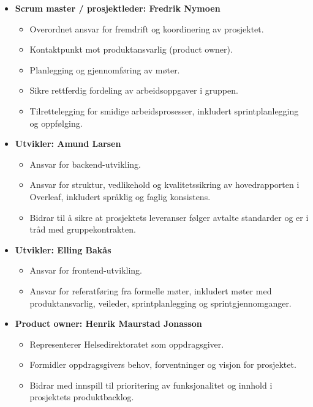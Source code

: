 \begin{itemize}
    \item \textbf{Scrum master / prosjektleder: Fredrik Nymoen}
        \begin{itemize}
            \item Overordnet ansvar for fremdrift og koordinering av prosjektet.
            \item Kontaktpunkt mot produktansvarlig (product owner).
            \item Planlegging og gjennomføring av møter.
            \item Sikre rettferdig fordeling av arbeidsoppgaver i gruppen.
            \item Tilrettelegging for smidige arbeidsprosesser, inkludert sprintplanlegging og oppfølging.
        \end{itemize}
        
    \item \textbf{Utvikler: Amund Larsen}
        \begin{itemize}
            \item Ansvar for backend-utvikling.
            \item Ansvar for struktur, vedlikehold og kvalitetssikring av hovedrapporten i Overleaf, inkludert språklig og faglig konsistens.
            \item Bidrar til å sikre at prosjektets leveranser følger avtalte standarder og er i tråd med gruppekontrakten.
        \end{itemize}
        
    \item \textbf{Utvikler: Elling Bakås}
        \begin{itemize}
            \item Ansvar for frontend-utvikling.
            \item Ansvar for referatføring fra formelle møter, inkludert møter med produktansvarlig, veileder, sprintplanlegging og sprintgjennomganger.
        \end{itemize}

    \item \textbf{Product owner: Henrik Maurstad Jonasson}
        \begin{itemize}
            \item Representerer Helsedirektoratet som oppdragsgiver.
            \item Formidler oppdragsgivers behov, forventninger og visjon for prosjektet.
            \item Bidrar med innspill til prioritering av funksjonalitet og innhold i prosjektets produktbacklog.
        \end{itemize}
        

\end{itemize}
